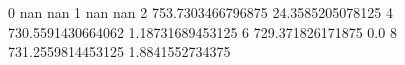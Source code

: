 0 nan nan
1 nan nan
2 753.7303466796875 24.3585205078125
4 730.5591430664062 1.18731689453125
6 729.371826171875 0.0
8 731.2559814453125 1.8841552734375
